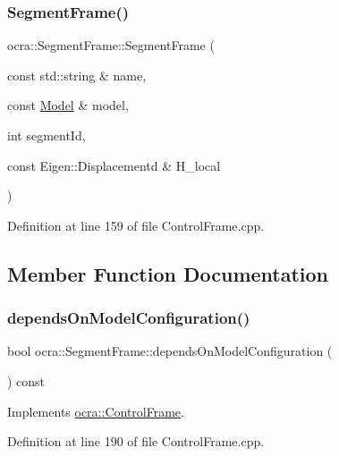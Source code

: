 \subsubsection{\texorpdfstring{Segment\+Frame()}{SegmentFrame()}\hspace{0.1cm}{\footnotesize\ttfamily [4/4]}}
{\footnotesize\ttfamily ocra\+::\+Segment\+Frame\+::\+Segment\+Frame (\begin{DoxyParamCaption}\item[{const std\+::string \&}]{name,  }\item[{const \hyperlink{classocra_1_1Model}{Model} \&}]{model,  }\item[{int}]{segment\+Id,  }\item[{const Eigen\+::\+Displacementd \&}]{H\+\_\+local }\end{DoxyParamCaption})}



Definition at line 159 of file Control\+Frame.\+cpp.



\subsection{Member Function Documentation}
\hypertarget{classocra_1_1SegmentFrame_a68708b5ced24d192fbb0bfd9e3647925}{}\label{classocra_1_1SegmentFrame_a68708b5ced24d192fbb0bfd9e3647925} 
\subsubsection{\texorpdfstring{depends\+On\+Model\+Configuration()}{dependsOnModelConfiguration()}}
{\footnotesize\ttfamily bool ocra\+::\+Segment\+Frame\+::depends\+On\+Model\+Configuration (\begin{DoxyParamCaption}{ }\end{DoxyParamCaption}) const\hspace{0.3cm}{\ttfamily [virtual]}}



Implements \hyperlink{classocra_1_1ControlFrame_a65833d1f3f42bc8d452f8b1fb671e142}{ocra\+::\+Control\+Frame}.



Definition at line 190 of file Control\+Frame.\+cpp.

